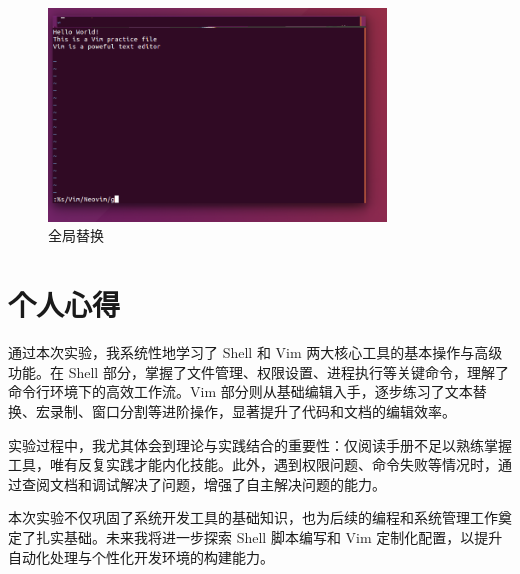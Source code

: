 \documentclass[a4paper]{article}
\begin{document}
\begin{enumerate}[itemsep=2\parskip, label=实例2.\arabic*, start=1]
\begin{description}[
leftmargin=7em,
labelwidth=5em,
labelsep=1em,
itemsep=1\parskip,
align=right
]
\begin{figure}[H]
  \centering
  \includegraphics[width=0.8\textwidth]{全局替换.png}
  \caption{全局替换}
  \label{fig:vim-global-replace}
\end{figure}
\end{description}
\end{enumerate}

\section*{个人心得}
通过本次实验，我系统性地学习了 Shell 和 Vim 两大核心工具的基本操作与高级功能。在 Shell 部分，掌握了文件管理、权限设置、进程执行等关键命令，理解了命令行环境下的高效工作流。Vim 部分则从基础编辑入手，逐步练习了文本替换、宏录制、窗口分割等进阶操作，显著提升了代码和文档的编辑效率。

实验过程中，我尤其体会到理论与实践结合的重要性：仅阅读手册不足以熟练掌握工具，唯有反复实践才能内化技能。此外，遇到权限问题、命令失败等情况时，通过查阅文档和调试解决了问题，增强了自主解决问题的能力。

本次实验不仅巩固了系统开发工具的基础知识，也为后续的编程和系统管理工作奠定了扎实基础。未来我将进一步探索 Shell 脚本编写和 Vim 定制化配置，以提升自动化处理与个性化开发环境的构建能力。
\end{document}
